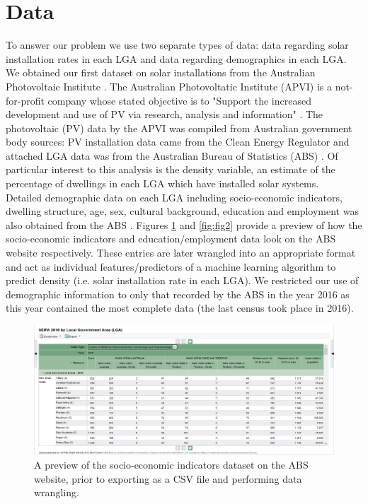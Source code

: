 \documentclass[a4paper]{article}
\begin{document}
\section{Data}

To answer our problem we use two separate types of data: data regarding solar installation rates in each LGA and data regarding demographics in each LGA. We obtained our first dataset on solar installations from the Australian Photovoltaic Institute \cite{pvdata}. The Australian Photovoltatic Institute (APVI) is a not-for-profit company whose stated objective is to "Support the increased development and use of PV via research, analysis and information" \cite{apvi}. The photovoltaic (PV) data by the APVI was compiled from Australian government body sources: PV installation data came from the Clean Energy Regulator \cite{pvdata, ceg} and attached LGA data was from the Australian Bureau of Statistics (ABS) \cite{pvdata, abspv}. Of particular interest to this analysis is the density variable, an estimate of the percentage of dwellings in each LGA which have installed solar systems. \\

Detailed demographic data on each LGA including socio-economic indicators, dwelling structure, age, sex, cultural background, education and employment was also obtained from the ABS \cite{abs}. Figures \ref{fig:fig1} and \ref{fig:fig2} provide a preview of how the socio-economic indicators and education/employment data look on the ABS website respectively. These entries are later wrangled into an appropriate format and act as individual features/predictors of a machine learning algorithm to predict density (i.e. solar installation rate in each LGA). We restricted our use of demographic information to only that recorded by the ABS in the year 2016 as this year contained the most complete data (the last census took place in 2016).

\begin{figure}
\centering
  \includegraphics[width=\linewidth]{fig1.png}
  \caption{A preview of the socio-economic indicators dataset on the ABS website, prior to exporting as a CSV file and performing data wrangling.}
  \label{fig:fig1}
\end{figure}
\end{document}
